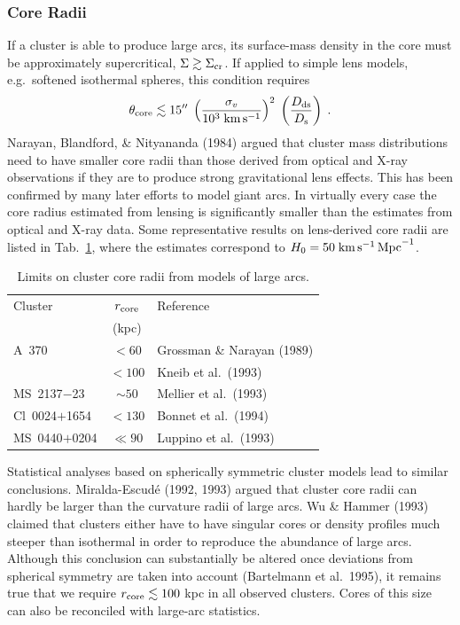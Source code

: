\documentclass[a4paper,10pt]{article} %
\newcommand{\la}{\lesssim}
\newcommand{\ga}{\gtrsim}
\begin{document}
\subsubsection{Core Radii}
\label{NB:subsubsect4.1.4}

If a cluster is able to produce large arcs, its surface-mass density
in the core must be approximately supercritical, $\Sigma\ga\Sigma_{\rm
cr}$. If applied to simple lens models, e.g.\ softened isothermal
spheres, this condition requires
\begin{equation}
  \theta_{\rm core} \la 15''\;
  \left(\frac{\sigma_v}{10^3\;{\rm km\,s^{-1}}}\right)^2\;
  \left(\frac{D_{\rm ds}}{D_{\rm s}}\right)\;.
\label{eq:4.5}
\end{equation}
Narayan, Blandford, \& Nityananda (1984) argued that cluster mass
distributions need to have smaller core radii than those derived from
optical and X-ray observations if they are to produce strong
gravitational lens effects. This has been confirmed by many later
efforts to model giant arcs. In virtually every case the core radius
estimated from lensing is significantly smaller than the estimates
from optical and X-ray data. Some representative results on
lens-derived core radii are listed in Tab.\ \ref{NB:tab4.2}, where the
estimates correspond to $H_0=50\;{\rm km\,s^{-1}\,Mpc}^{-1}$.

\begin{table}
  \caption{Limits on cluster core radii from models of large arcs.}
\medskip %
  \begin{center}
  \begin{tabular}{|l|cl|}
  \hline\hline
    Cluster & $r_{\rm core}$ & Reference \\
    & (kpc) & \\
  \hline\hline
    A~370 & $<60$ & Grossman \& Narayan (1989) \\
    & $<100$ & Kneib et al.\ (1993) \\
  \hline
    MS~2137$-$23 & $\sim50$ & Mellier et al.\ (1993) \\
  \hline
    Cl~0024$+$1654 & $<130$ & Bonnet  et al.\ (1994) \\
  \hline
    MS~0440$+$0204 & $\ll90$ & Luppino et al.\ (1993) \\
  \hline\hline
  \end{tabular}
  \end{center}
\label{NB:tab4.2}
\end{table}

Statistical analyses based on spherically symmetric cluster models
lead to similar conclusions. Miralda-Escud\'e (1992, 1993) argued that
cluster core radii can hardly be larger than the curvature radii of
large arcs. Wu \& Hammer (1993) claimed that clusters either have to
have singular cores or density profiles much steeper than isothermal
in order to reproduce the abundance of large arcs. Although this
conclusion can substantially be altered once deviations from spherical
symmetry are taken into account (Bartelmann et al.\ 1995), it remains
true that we require $r_{\rm core}\la100$ kpc in all observed
clusters. Cores of this size can also be reconciled with large-arc
statistics.
\end{document}
